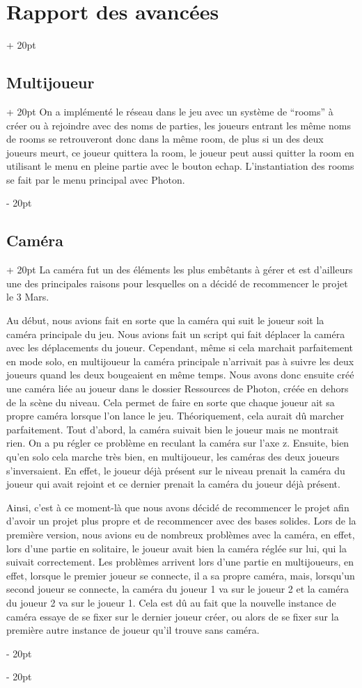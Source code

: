 \documentclass[a4paper, 12pt, twoside]{article}
\newcommand{\ind}[1][20pt]{\advance\leftskip + #1}
\newcommand{\deind}[1][20pt]{\advance\leftskip - #1}
\newenvironment{indt}[2][20pt]{#2 \par \ind[#1]}{\par \deind} %
\begin{document}
\begin{indt}{\section{Rapport des avancées}}
\begin{indt}{\subsection{Multijoueur}}
            On a implémenté le réseau dans le jeu avec un système de “rooms” à créer ou à rejoindre avec des noms de parties, les joueurs entrant les même noms de rooms se retrouveront donc dans la même room, de plus si un des deux joueurs meurt, ce joueur quittera la room, le joueur peut aussi quitter la room en utilisant le menu en pleine partie avec le bouton echap. L'instantiation des rooms se fait par le menu principal avec Photon. 
        \end{indt}

        \begin{indt}{\subsection{Caméra}}
            La caméra fut un des éléments les plus embêtants à gérer et est d'ailleurs une des principales raisons pour lesquelles on a décidé de recommencer le projet le 3 Mars. 

            Au début, nous avions fait en sorte que la caméra qui suit le joueur soit la caméra principale du jeu. Nous avions fait un script qui fait déplacer la caméra avec les déplacements du joueur. Cependant, même si cela marchait parfaitement en mode solo, en multijoueur la caméra principale n'arrivait pas à suivre les deux joueurs quand les deux bougeaient en même temps. Nous avons donc ensuite créé une caméra liée au joueur dans le dossier Ressources de Photon, créée en dehors de la scène du niveau. Cela permet de faire en sorte que chaque joueur ait sa propre caméra lorsque l'on lance le jeu. Théoriquement, cela aurait dû marcher parfaitement. Tout d'abord, la caméra suivait bien le joueur mais ne montrait rien. On a pu régler ce problème en reculant la caméra sur l'axe z. Ensuite, bien qu'en solo cela marche très bien, en multijoueur, les caméras des deux joueurs s'inversaient. En effet, le joueur déjà présent sur le niveau prenait la caméra du joueur qui avait rejoint et ce dernier prenait la caméra du joueur déjà présent.

            Ainsi, c'est à ce moment-là que nous avons décidé de recommencer le projet afin d'avoir un projet plus propre et de recommencer avec des bases solides. Lors de la première version, nous avions eu de nombreux problèmes avec la caméra, en effet, lors d'une partie en solitaire, le joueur avait bien la caméra réglée sur lui, qui la suivait correctement. Les problèmes arrivent lors d'une partie en multijoueurs, en effet, lorsque le premier joueur se connecte, il a sa propre caméra, mais, lorsqu'un second joueur se connecte, la caméra du joueur 1 va sur le joueur 2 et la caméra du joueur 2 va sur le joueur 1. Cela est dû au fait que la nouvelle instance de caméra essaye de se fixer sur le dernier joueur créer, ou alors de se fixer sur la première autre instance de joueur qu'il trouve sans caméra.


\end{indt}
\end{indt}
\end{document}
